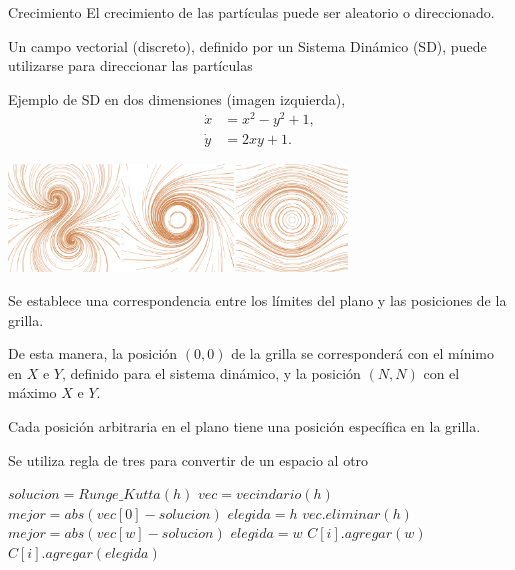 \documentclass[spanish]{beamer}
\begin{document}
\begin{frame}{Crecimiento}
El crecimiento de las partículas puede ser aleatorio o direccionado.

Un campo vectorial (discreto), definido por un Sistema Dinámico (SD), puede utilizarse para direccionar las partículas 

Ejemplo de SD en dos dimensiones (imagen izquierda),
\begin{equation*} \label{eq:simple}  
  \begin{aligned}
    \dot{x} &= x^{2}-y^{2}+1,\\
    \dot{y} &= 2xy+1.
  \end{aligned}
\end{equation*}
  \centerline{\includegraphics[width=9cm]{../figures/Fig2}}
\end{frame}

\begin{frame}
Se establece una correspondencia entre los límites del plano y las posiciones de la grilla.

De esta manera, la posición $(0,0)$ de la grilla se corresponderá con el mínimo en $X$ e $Y$, definido para el sistema dinámico, y la posición $(N,N)$ con el máximo $X$ e $Y$.

Cada posición arbitraria en el plano tiene una posición específica en la grilla.

Se utiliza regla de tres para convertir de un espacio al otro

\end{frame}

\begin{frame}
\begin{algorithm}[H]
\begin{algorithmic}[1]
\STATE $solucion = Runge\_Kutta(h)$
\STATE $vec = vecindario(h)$
\STATE $mejor = abs(vec[0] - solucion)$
\STATE $elegida = h$
\STATE $vec.eliminar(h)$
        \STATE $mejor = abs(vec[w]-solucion)$
        \STATE $elegida = w$
    \ENDIF
        \STATE $C[i].agregar(w)$
    \ENDIF
\ENDFOR
\STATE $C[i].agregar(elegida)$
\end{algorithmic}
\end{algorithm}
\end{frame}
\end{document}

